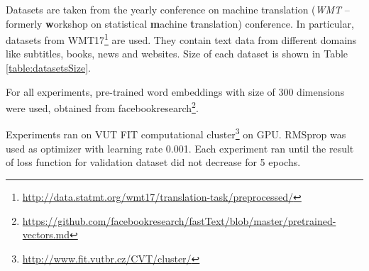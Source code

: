 \documentclass{ExcelAtFIT}
\begin{document}
Datasets are taken from the yearly conference on machine translation (\emph{WMT} -- formerly \textbf{w}orkshop on statistical \textbf{m}achine \textbf{t}ranslation) conference. In particular, datasets from WMT17\footnote{\url{http://data.statmt.org/wmt17/translation-task/preprocessed/}} are used. They contain text data from different domains like subtitles, books, news and websites. Size of each dataset is shown in Table \ref{table:datasetsSize}.

For all experiments, pre-trained word embeddings with size of 300 dimensions were used, obtained from facebookresearch\footnote{\url{https://github.com/facebookresearch/fastText/blob/master/pretrained-vectors.md}}.

Experiments ran on VUT FIT computational cluster\footnote{\url{http://www.fit.vutbr.cz/CVT/cluster/}} on GPU. RMSprop was used as optimizer with learning rate 0.001. Each experiment ran until the result of loss function for validation dataset did not decrease for 5 epochs.

\vspace{3mm}
\end{document}
